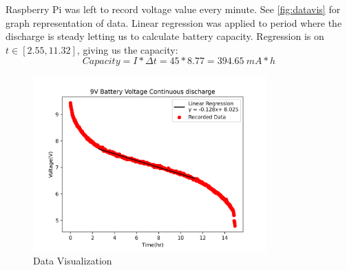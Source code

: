 Raspberry Pi was left to record voltage value every minute. See \autoref{fig:datavis} for graph representation of data.\citep{project} 
Linear regression was applied to period where the discharge is steady letting us to calculate battery capacity. Regression is on $t \in[2.55,11.32]$, giving us the capacity:
\begin{equation}
    {Capacity} = {I}*{\Delta t} = 45 * 8.77 = 394.65 \ mA*h
    \label{eq:capacity}
\end{equation}{}

\begin{figure}[t]
\centering
\includegraphics[width=0.8\textwidth]{ex1test.png}
\caption{Data Visualization}
\label{fig:datavis}
\end{figure}